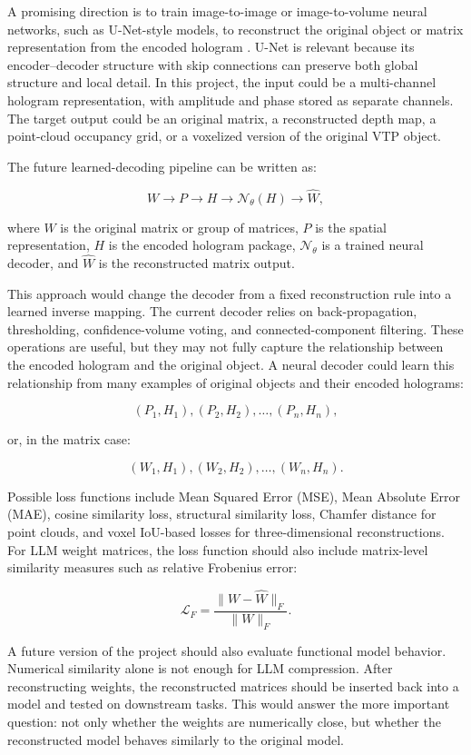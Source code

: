 \documentclass{article}
\begin{document}
\begin{normalsize}
A promising direction is to train image-to-image or image-to-volume neural networks, such as U-Net-style models, to reconstruct the original object or matrix representation from the encoded hologram \cite{ronneberger2015}. U-Net is relevant because its encoder--decoder structure with skip connections can preserve both global structure and local detail. In this project, the input could be a multi-channel hologram representation, with amplitude and phase stored as separate channels. The target output could be an original matrix, a reconstructed depth map, a point-cloud occupancy grid, or a voxelized version of the original VTP object.

The future learned-decoding pipeline can be written as:

\[
W \rightarrow P \rightarrow H \rightarrow \mathcal{N}_{\theta}(H) \rightarrow \hat{W},
\]

where \(W\) is the original matrix or group of matrices, \(P\) is the spatial representation, \(H\) is the encoded hologram package, \(\mathcal{N}_{\theta}\) is a trained neural decoder, and \(\hat{W}\) is the reconstructed matrix output.

This approach would change the decoder from a fixed reconstruction rule into a learned inverse mapping. The current decoder relies on back-propagation, thresholding, confidence-volume voting, and connected-component filtering. These operations are useful, but they may not fully capture the relationship between the encoded hologram and the original object. A neural decoder could learn this relationship from many examples of original objects and their encoded holograms:

\[
(P_1,H_1), (P_2,H_2), \ldots, (P_n,H_n),
\]

or, in the matrix case:

\[
(W_1,H_1), (W_2,H_2), \ldots, (W_n,H_n).
\]

Possible loss functions include Mean Squared Error (MSE), Mean Absolute Error (MAE), cosine similarity loss, structural similarity loss, Chamfer distance for point clouds, and voxel IoU-based losses for three-dimensional reconstructions. For LLM weight matrices, the loss function should also include matrix-level similarity measures such as relative Frobenius error:

\[
\mathcal{L}_{F} =
\frac{\lVert W - \hat{W} \rVert_F}{\lVert W \rVert_F}.
\]

A future version of the project should also evaluate functional model behavior. Numerical similarity alone is not enough for LLM compression. After reconstructing weights, the reconstructed matrices should be inserted back into a model and tested on downstream tasks. This would answer the more important question: not only whether the weights are numerically close, but whether the reconstructed model behaves similarly to the original model.


\end{normalsize}
\end{document}
